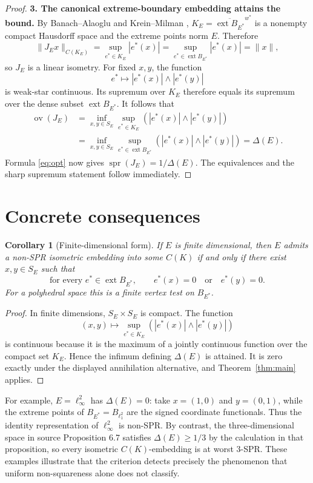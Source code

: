 \documentclass[11pt]{article}
\newtheorem{corollary}[theorem]{Corollary}
\newcommand{\ext}{\operatorname{ext}}
\newcommand{\spr}{\operatorname{spr}}
\newcommand{\ov}{\operatorname{ov}}
\begin{document}
\begin{proof}
\medskip
\noindent\textbf{3. The canonical extreme-boundary embedding attains the
bound.}
By Banach--Alaoglu and Krein--Milman \cite[Chapters 3--4]{Megginson},
$K_E=\overline{\ext B_{E^*}}^{w^*}$ is a nonempty compact Hausdorff space and
the extreme points norm $E$.  Therefore
\[
 \|J_E x\|_{C(K_E)}
 =\sup_{e^*\in K_E}|e^*(x)|
 =\sup_{e^*\in\ext B_{E^*}}|e^*(x)|
 =\|x\|,
\]
so $J_E$ is a linear isometry.  For fixed $x,y$, the function
\[
 e^*\longmapsto |e^*(x)|\wedge|e^*(y)|
\]
is weak-star continuous.  Its supremum over $K_E$ therefore equals its
supremum over the dense subset $\ext B_{E^*}$.  It follows that
\begin{align*}
 \ov(J_E)
 &=\inf_{x,y\in S_E}\sup_{e^*\in K_E}
       (|e^*(x)|\wedge|e^*(y)|)\\
 &=\inf_{x,y\in S_E}\sup_{e^*\in\ext B_{E^*}}
       (|e^*(x)|\wedge|e^*(y)|)
 =\Delta(E).
\end{align*}
Formula \eqref{eq:opt} now gives
$\spr(J_E)=1/\Delta(E)$.  The equivalences and the sharp supremum statement
follow immediately.
\end{proof}

\section{Concrete consequences}

\begin{corollary}[Finite-dimensional form]\label{cor:finite}
If $E$ is finite dimensional, then $E$ admits a non-SPR isometric embedding
into some $C(K)$ if and only if there exist $x,y\in S_E$ such that
\[
 \text{for every }e^*\in\ext B_{E^*},
 \qquad e^*(x)=0\quad\text{or}\quad e^*(y)=0.
\]
For a polyhedral space this is a finite vertex test on $B_{E^*}$.
\end{corollary}

\begin{proof}
In finite dimensions, $S_E\times S_E$ is compact.  The function
\[
 (x,y)\longmapsto\sup_{e^*\in K_E}
 (|e^*(x)|\wedge|e^*(y)|)
\]
is continuous because it is the maximum of a jointly continuous function over
the compact set $K_E$.  Hence the infimum defining $\Delta(E)$ is attained.
It is zero exactly under the displayed annihilation alternative, and
Theorem~\ref{thm:main} applies.
\end{proof}

For example, $E=\ell_\infty^2$ has $\Delta(E)=0$: take
$x=(1,0)$ and $y=(0,1)$, while the extreme points of $B_{E^*}=B_{\ell_1^2}$
are the signed coordinate functionals.  Thus the identity representation of
$\ell_\infty^2$ is non-SPR.  By contrast, the three-dimensional space in
source Proposition 6.7 satisfies $\Delta(E)\geq1/3$ by the calculation in that
proposition, so every isometric $C(K)$-embedding is at worst $3$-SPR.  These
examples illustrate that the criterion detects precisely the phenomenon that
uniform non-squareness alone does not classify.
\end{document}
